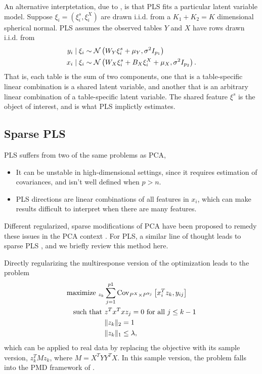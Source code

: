 \documentclass[14pt]{extarticle}
\begin{document}
An alternative interptetation, due to \citep{gustafsson2001probabilistic}, is
that PLS fits a particular latent variable model. Suppose $\xi_{i} =
\left(\xi_{i}^{s}, \xi_{i}^{X}\right)$ are drawn i.i.d. from a $K_{1} + K_{2} =
K$ dimensional spherical normal. PLS assumes the observed tables $Y$ and $X$
have rows drawn i.i.d. from
\begin{align*}
y_{i} \mid \xi_{i} &\sim \mathcal{N}\left(W_{Y}\xi_{i}^{s} +
\mu_{Y}, \sigma^{2}I_{p_{1}}\right) \\
x_{i} \mid \xi_{i} &\sim \mathcal{N}\left(W_{X} \xi_{i}^{s} + B_{X}\xi_{i}^{X} +
\mu_{X}, \sigma^{2}I_{p_{2}}\right).
\end{align*}
That is, each table is the sum of two components, one that is a
table-specific linear combination is a shared latent variable, and
another that is an arbitrary linear combination of a table-specific
latent variable. The shared feature $\xi^{s}$ is the object of
interest, and is what PLS implictly estimates.

\subsection{Sparse PLS}
\label{subsec:spls}

PLS suffers from two of the same problems as PCA,
\begin{itemize}
\item It can be unstable in high-dimensional settings, since it requires
  estimation of covariances, and isn't well defined when $p > n$.
\item PLS directions are linear combinations of all features in $x_i$, which can
  make results difficult to interpret when there are many features.
\end{itemize}

Different regularized, sparse modifications of PCA have been proposed to remedy
these issues in the PCA context \citep{zou2006sparse, witten2009penalized}. For
PLS, a similar line of thought leads to sparse PLS \citep{chun2010sparse}, and
we briefly review this method here.

Directly regularizing the multiresponse version of the
optimization \label{eq:pls_obj} leads to the problem
\begin{align*}
  \text{maximize }_{z_k} &\sum_{j = 1}^{p1} \mathrm{Cov}_{P^X \times P^{y_j}}\left[{x_i^T z_k, y_{ij}}\right] \\
  \text{such that }&z^{T}x^{T}x z_{j} = 0 \text{ for all }j \leq k - 1 \\
  &\|z_k\|_2 = 1 \\
  &\|z_k\|_1 \leq \lambda,
\end{align*}
which can be applied to real data by replacing the objective with its sample
version, $z_k^{T} M z_k$, where $M = X^{T}YY^{T}X$. In this sample version, the
problem falls into the PMD framework of \citep{witten2009penalized}.
\end{document}
